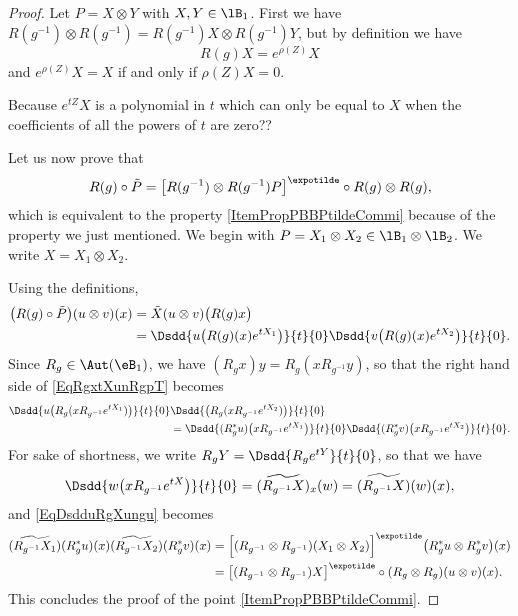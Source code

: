 \begin{proof}
	Let $P=X\otimes Y$ with $X,Y\in\lB_1$. First we have $R(g^{-1})\otimes R(g^{-1})=R(g^{-1})X\otimes R(g^{-1})Y$, but by definition we have
	\begin{equation}
		R(g)X= e^{\rho(Z)}X
	\end{equation}
	and $ e^{\rho(Z)}X=X$ if and only if $\rho(Z)X=0$.
	\begin{probleme}
		Because $ e^{tZ}X$ is a polynomial in $t$ which can only be equal to $X$ when the coefficients of all the powers of $t$ are zero??
	\end{probleme}

	Let us now prove that 
	\begin{equation}
		R(g)\circ\tilde P=\big[ R(g^{-1})\otimes R(g^{-1})P \big]^{\expotilde}\circ R(g)\otimes R(g),
	\end{equation}
	which is equivalent to the property \ref{ItemPropPBBPtildeCommi} because of the property we just mentioned. We begin with $P=X_1\otimes X_2\in\lB_1\otimes \lB_2$. We write $X=X_1\otimes X_2$.

	Using the definitions,
	\begin{equation}		\label{EqRgxtXunRgpT}
		\begin{aligned}[]
			\big( R(g)\circ \tilde P \big)(u\otimes v)(x)&=\tilde X(u\otimes v)\big( R(g)x \big)\\
			&=\Dsdd{ u\big( R(g)(x) e^{tX_1} \big) }{t}{0}\Dsdd{ v\big( R(g)(x) e^{tX_2} \big) }{t}{0}.
		\end{aligned}
	\end{equation}
	Since $R_g\in\Aut(\eB_1)$, we have $(R_gx)y=R_g(xR_{g^{-1}}y)$, so that the right hand side of \eqref{EqRgxtXunRgpT} becomes
	\begin{equation}	\label{EqDsdduRgXungu}
		\begin{aligned}[]
			\Dsdd{ u\big( R_g(xR_{g^{-1}} e^{tX_1}) \big) }{t}{0}&\Dsdd{ \big(   R_g(xR_{g^{-1}} e^{tX_2})    \big) }{t}{0}\\
			&=\Dsdd{ (R^*_gu)\big( xR_{g^{-1}} e^{tX_1}\big)}{t}{0}\Dsdd{ (R^*_gv)\big( xR_{g^{-1}} e^{tX_2} \big) }{t}{0}.
		\end{aligned}
	\end{equation}
	For sake of shortness, we write $R_gY=\Dsdd{ R_g e^{tY} }{t}{0}$, so that we have
	\begin{equation}
			\Dsdd{ w\big( xR_{g^{-1}} e^{tX} \big) }{t}{0}=(\widetilde{ R_{g^{-1}}X })_x(w)
			=\widetilde{ (R_{g^{-1}}X) }(w)(x),
	\end{equation}
	and \eqref{EqDsdduRgXungu} becomes
	\begin{equation}
		\begin{aligned}[]
			(\widetilde{ R_{g^{-1}}X_1 })(R_g^*u)(x)(\widetilde{ R_{g^{-1}}X_2 })(R_g^*v)(x)&=\Big[ (R_{g^{-1}}\otimes R_{g^{-1}})(X_1\otimes X_2) \Big]^{\expotilde}\big( R^*_gu\otimes R^*_gv \big)(x)\\
			&=\big[ (R_{g^{-1}}\otimes R_{g^{-1}})X \big]^{\expotilde}\circ(R_g\otimes R_g)(u\otimes v)(x).
		\end{aligned}
	\end{equation}
	This concludes the proof of the point \ref{ItemPropPBBPtildeCommi}.


\end{proof}
